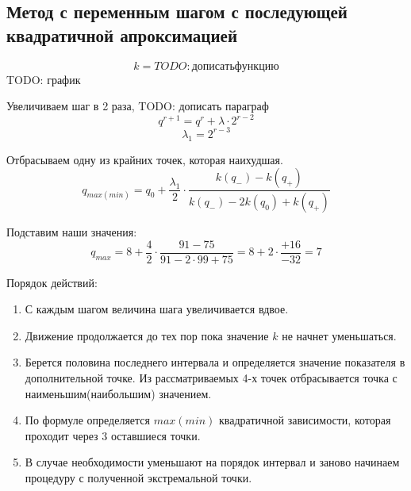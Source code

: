 \documentclass[12pt,a5paper]{scrbook}
\begin{document}
  \subsection{Метод с переменным шагом с последующей квадратичной апроксимацией}
  $$k = TODO: дописать функцию$$
  TODO: график
  \par
  Увеличиваем шаг в 2 раза, TODO: дописать параграф
  $$q^{r+1} = q^r + \lambda \cdot 2^{r-2}$$
  $$\lambda_1 = 2^{r-3}$$
  \par
  Отбрасываем одну из крайних точек, которая наихудшая.
  $$q_{max(min)} = q_0 + \frac{\lambda_1}{2} \cdot \frac{k(q_-) - k(q_+)}{k(q_-) - 2k(q_0) + k(q_+)}$$
  \par
  Подставим наши значения:
  $$q_{max} = 8 + \frac{4}{2} \cdot \frac{91 - 75}{91 - 2 \cdot 99 + 75} = 8 + 2 \cdot \frac{+16}{-32} = 7$$
  \par
  Порядок действий:
  \begin{enumerate}
    \item С каждым шагом величина шага увеличивается вдвое.
    \item Движение продолжается до тех пор пока значение $k$ не начнет уменьшаться.
    \item Берется половина последнего интервала и определяется значение показателя в дополнительной точке. Из рассматриваемых 4-х точек отбрасывается точка с наименьшим(наибольшим) значением.
    \item По формуле определяется $max(min)$ квадратичной зависимости, которая проходит через 3 оставшиеся точки.
    \item В случае необходимости уменьшают на порядок интервал и заново начинаем процедуру с полученной экстремальной точки.
  \end{enumerate}
\end{document}
